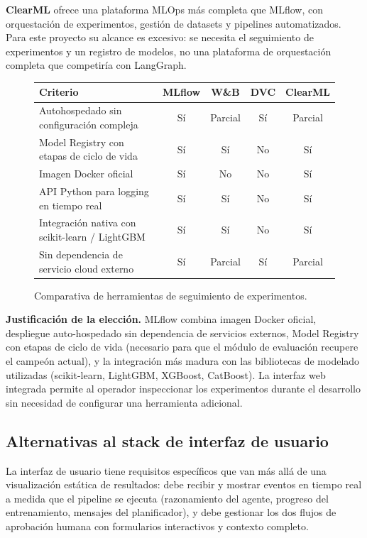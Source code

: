\textbf{ClearML} ofrece una plataforma MLOps más completa que MLflow, con orquestación de experimentos, gestión de datasets y pipelines automatizados. Para este proyecto su alcance es excesivo: se necesita el seguimiento de experimentos y un registro de modelos, no una plataforma de orquestación completa que competiría con LangGraph.

\begin{figure}[H]
\centering
\begin{tabular}{lcccc}
\hline
\textbf{Criterio} & \textbf{MLflow} & \textbf{W\&B} & \textbf{DVC} & \textbf{ClearML} \\
\hline
Autohospedado sin configuración compleja & Sí & Parcial & Sí & Parcial \\
Model Registry con etapas de ciclo de vida & Sí & Sí & No & Sí \\
Imagen Docker oficial & Sí & No & No & Sí \\
API Python para logging en tiempo real & Sí & Sí & No & Sí \\
Integración nativa con scikit-learn / LightGBM & Sí & Sí & No & Sí \\
Sin dependencia de servicio cloud externo & Sí & Parcial & Sí & Parcial \\
\hline
\end{tabular}
\caption{Comparativa de herramientas de seguimiento de experimentos.}
\label{tab:alt-mlflow}
\end{figure}

\textbf{Justificación de la elección.} MLflow combina imagen Docker oficial, despliegue auto-hospedado sin dependencia de servicios externos, Model Registry con etapas de ciclo de vida (necesario para que el módulo de evaluación recupere el campeón actual), y la integración más madura con las bibliotecas de modelado utilizadas (scikit-learn, LightGBM, XGBoost, CatBoost). La interfaz web integrada permite al operador inspeccionar los experimentos durante el desarrollo sin necesidad de configurar una herramienta adicional.


\subsection{Alternativas al stack de interfaz de usuario}
\label{sec:alt-frontend}

La interfaz de usuario tiene requisitos específicos que van más allá de una visualización estática de resultados: debe recibir y mostrar eventos en tiempo real a medida que el pipeline se ejecuta (razonamiento del agente, progreso del entrenamiento, mensajes del planificador), y debe gestionar los dos flujos de aprobación humana con formularios interactivos y contexto completo.

